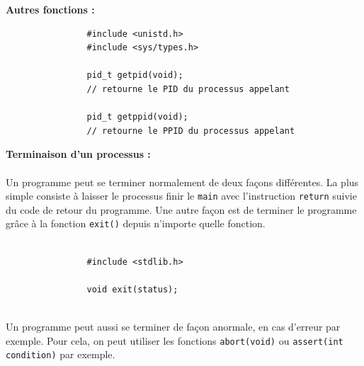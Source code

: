 		\begin{frame}[containsverbatim]
			\noindent \textbf{Autres fonctions :}~\\
			\begin{lstlisting}
				#include <unistd.h>
				#include <sys/types.h>

				pid_t getpid(void);
				// retourne le PID du processus appelant
				
				pid_t getppid(void);
				// retourne le PPID du processus appelant
			\end{lstlisting}
		\end{frame}	
		
		\begin{frame}[containsverbatim]
			\textbf{Terminaison d'un processus :}\\~\\
			Un programme peut se terminer normalement de deux façons différentes. La plus simple consiste à laisser le processus finir le \lstinline!main! avec l'instruction \lstinline!return! suivie du code de retour du programme. Une autre façon est de terminer le programme grâce à la fonction \lstinline!exit()! depuis n'importe quelle fonction.
			\\~\\
			\begin{lstlisting}
				#include <stdlib.h>

				void exit(status);
			\end{lstlisting}
			~\\
			Un programme peut aussi se terminer de façon anormale, en cas d'erreur par exemple. Pour cela, on peut utiliser les fonctions \lstinline!abort(void)! ou \lstinline!assert(int condition)! par exemple. 
		\end{frame}	
		
